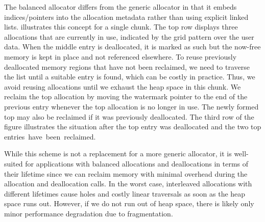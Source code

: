 

The balanced allocator differs from the generic allocator in that it embeds indices/pointers into the allocation metadata rather than using explicit linked lists.
 illustrates this concept for a single chunk.
The top row displays three allocations that are currently in use, indicated by the grid pattern over the user data.
When the middle entry is deallocated, it is marked as such but the now-free memory is kept in place and not referenced elsewhere.
To reuse previously deallocated memory regions that have not been reclaimed, we need to traverse the list until a suitable entry is found, which can be costly in practice.
Thus, we avoid reusing allocations until we exhaust the heap space in this chunk.
We reclaim the top allocation by moving the watermark pointer to the end of the previous entry whenever the top allocation is no longer in use.
The newly formed top may also be reclaimed if it was previously deallocated.
The third row of the figure illustrates the situation after the top entry was deallocated and the two top entries~have~been~reclaimed.

While this scheme is not a replacement for a more generic allocator, it is well-suited for applications with balanced allocations and deallocations in terms of their lifetime since we can reclaim memory with minimal overhead during the allocation and deallocation calls.
In the worst case, interleaved allocations with different lifetimes cause holes and costly linear traversals as soon as the heap space runs out.
However, if we do not run out of heap space, there is likely only minor performance degradation due to fragmentation.
